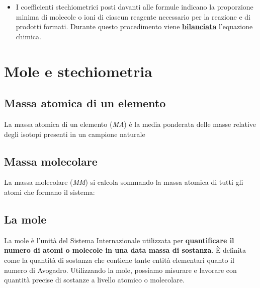 \documentclass{article}
\begin{document}
\begin{itemize}
    \item I coefficienti stechiometrici posti davanti alle formule indicano la proporzione minima
        di molecole o ioni di ciascun reagente necessario per la reazione e di prodotti formati.
        Durante questo procedimento viene \textbf{\underline{bilanciata}} l'equazione chimica. 
        \begin{figure}[h!]
            \begin{center}
            \end{center}
        \end{figure}
\end{itemize}
\pagebreak

\section{Mole e stechiometria}

\subsection{Massa atomica di un elemento}

La massa atomica di un elemento (\textit{MA}) è la media ponderata delle masse relative degli
isotopi presenti in un campione naturale
\hyperlink{massa atomica}{}
\subsection{Massa molecolare}
La massa molecolare (\textit{MM}) si calcola sommando la massa atomica di tutti gli atomi che
formano il sistema:
\begin{figure}[h!]
    \begin{center}
    \end{center}
\end{figure}
\subsection{La mole}
La mole è l'unità del Sistema Internazionale utilizzata per \textbf{quantificare il numero di
atomi o molecole in una data massa di sostanza}. È definita come la quantità di sostanza che
contiene tante entità elementari quanto il numero di Avogadro.
Utilizzando la mole, possiamo misurare e lavorare con quantità precise di sostanze a livello
atomico o molecolare.
\begin{figure}[h!]
    \begin{center}
    \end{center}
\end{figure}
\end{document}
